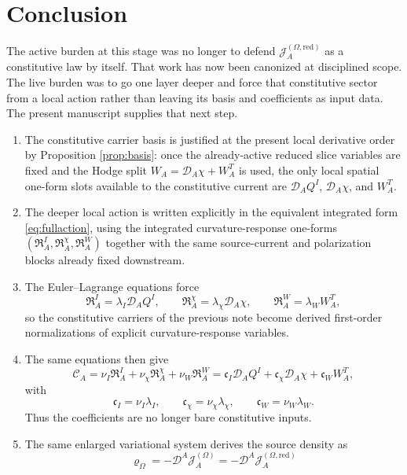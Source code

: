 \documentclass[11pt]{article}
\newcommand{\SpatialD}{\mathcal D}
\newcommand{\SourceDensity}{\varrho_\Omega}
\newcommand{\SourceCurrent}{\mathcal J^{(\Omega)}}
\newcommand{\SourceCurrentRed}{\mathcal J^{(\Omega,\mathrm{red})}}
\newcommand{\ConstCurrent}{\mathcal C}
\begin{document}
\section{Conclusion}

The active burden at this stage was no longer to defend \(\SourceCurrentRed_A\) as a constitutive law by itself. That work has now been canonized at disciplined scope. The live burden was to go one layer deeper and force that constitutive sector from a local action rather than leaving its basis and coefficients as input data. The present manuscript supplies that next step.

\begin{enumerate}
    \item The constitutive carrier basis is justified at the present local derivative order by Proposition \ref{prop:basis}: once the already-active reduced slice variables are fixed and the Hodge split \(W_A=\SpatialD_A\chi+W_A^T\) is used, the only local spatial one-form slots available to the constitutive current are \(\SpatialD_AQ^I\), \(\SpatialD_A\chi\), and \(W_A^T\).
    \item The deeper local action is written explicitly in the equivalent integrated form \eqref{eq:fullaction}, using the integrated curvature-response one-forms \((\mathfrak R_A^I,\mathfrak R_A^\chi,\mathfrak R_A^W)\) together with the same source-current and polarization blocks already fixed downstream.
    \item The Euler--Lagrange equations force
    \[
    \mathfrak R_A^I=\lambda_I\SpatialD_AQ^I,
    \qquad
    \mathfrak R_A^\chi=\lambda_\chi\SpatialD_A\chi,
    \qquad
    \mathfrak R_A^W=\lambda_WW_A^T,
    \]
    so the constitutive carriers of the previous note become derived first-order normalizations of explicit curvature-response variables.
    \item The same equations then give
    \[
    \ConstCurrent_A
    =
    \nu_I\mathfrak R_A^I
    +\nu_\chi\mathfrak R_A^\chi
    +\nu_W\mathfrak R_A^W
    =
    \mathfrak c_I\SpatialD_AQ^I
    +\mathfrak c_\chi\SpatialD_A\chi
    +\mathfrak c_WW_A^T,
    \]
    with
    \[
    \mathfrak c_I=\nu_I\lambda_I,
    \qquad
    \mathfrak c_\chi=\nu_\chi\lambda_\chi,
    \qquad
    \mathfrak c_W=\nu_W\lambda_W.
    \]
    Thus the coefficients are no longer bare constitutive inputs.
    \item The same enlarged variational system derives the source density as
    \[
    \SourceDensity
    =
    -\SpatialD^A\SourceCurrent_A
    =
    -\SpatialD^A\SourceCurrentRed_A
\]
\end{enumerate}
\end{document}
